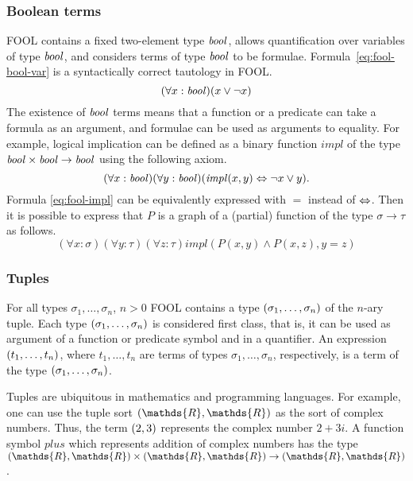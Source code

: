 \documentclass{easychair}
\begin{document}
\subsubsection*{Boolean terms}
FOOL contains a fixed two-element type $\mathit{bool}$, allows quantification over 
variables of type $\mathit{bool}$, and considers terms of type $\mathit{bool}$ to be formulae. 
Formula~\ref{eq:fool-bool-var} is a syntactically correct tautology in FOOL.
\begin{equation}\label{eq:fool-bool-var}
(\forall x:\mathit{bool})(x \lor \neg x)
\end{equation}
The existence of $\mathit{bool}$ terms means that a function or a predicate can take 
a formula as an argument, and formulae can be used as arguments to equality.
For example, logical implication can be defined as a binary function
$\mathit{impl}$ of the type $\mathit{bool} \times \mathit{bool} \to \mathit{bool}$ using the following
axiom.
\begin{equation}\label{eq:fool-impl}
(\forall x:\mathit{bool})(\forall y:\mathit{bool})(\mathit{impl}(x,y) \Leftrightarrow \neg x \lor y).
\end{equation}
Formula \ref{eq:fool-impl} can be equivalently expressed with $=$ instead of
$\Leftrightarrow$.
Then it is possible to express that $P$ is a graph of a (partial) function of 
the type $\sigma \to \tau$ as follows.
\begin{equation}\label{eq:bool-arg-example}
(\forall x:\sigma)(\forall y:\tau)(\forall z:\tau)
\mathit{impl}(P(x,y) \land P(x,z), y = z)
\end{equation}

\subsubsection*{Tuples}
For all types $\sigma_1,\ldots,\sigma_n$, $n>0$ FOOL contains a type $({\sigma_1,\ldots,\sigma_n})$ of the $n$-ary tuple. Each type
$({\sigma_1,\ldots,\sigma_n})$ is considered first class, that is, it can be
used as argument of a function or predicate symbol and in a quantifier.
An expression $({t_1,\ldots,t_n})$, where $t_1,\ldots,t_n$ are terms of
types $\sigma_1,\ldots,\sigma_n$, respectively, is a term of the type
$({\sigma_1,\ldots,\sigma_n})$.

Tuples are ubiquitous in mathematics and programming languages. For example,
one can use the tuple sort $\tuple{\mathds{R},\mathds{R}}$ as the sort of
complex numbers. Thus, the term $({2,3})$ represents the complex number
$2+3i$. A function symbol $\mathit{plus}$ which represents addition of complex numbers has the type $\tuple{\mathds{R},\mathds{R}} \times \tuple{\mathds{R},\mathds{R}} \to \tuple{\mathds{R},\mathds{R}}$.
\end{document}
